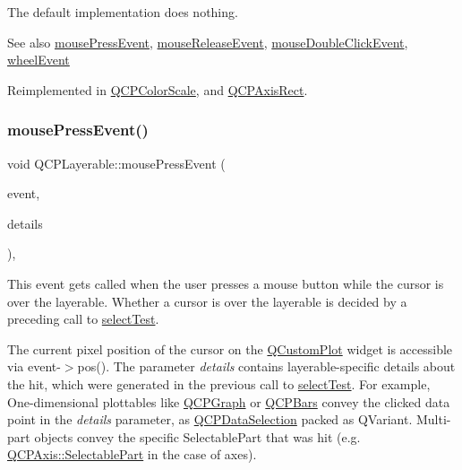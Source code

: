 The default implementation does nothing.

\begin{DoxySeeAlso}{See also}
\mbox{\hyperlink{class_q_c_p_layerable_af6567604818db90f4fd52822f8bc8376}{mouse\+Press\+Event}}, \mbox{\hyperlink{class_q_c_p_layerable_aa0d79b005686f668622bbe66ac03ba2c}{mouse\+Release\+Event}}, \mbox{\hyperlink{class_q_c_p_layerable_a4171e2e823aca242dd0279f00ed2de81}{mouse\+Double\+Click\+Event}}, \mbox{\hyperlink{class_q_c_p_layerable_a47dfd7b8fd99c08ca54e09c362b6f022}{wheel\+Event}} 
\end{DoxySeeAlso}


Reimplemented in \mbox{\hyperlink{class_q_c_p_color_scale_a3b2bd79725aefaf2630fc76e90939442}{Q\+C\+P\+Color\+Scale}}, and \mbox{\hyperlink{class_q_c_p_axis_rect_a9cd27ad8c5cfb49aefd9dbb30def4beb}{Q\+C\+P\+Axis\+Rect}}.

\mbox{\label{class_q_c_p_layerable_af6567604818db90f4fd52822f8bc8376}} 
\subsubsection{\texorpdfstring{mouse\+Press\+Event()}{mousePressEvent()}}
{\footnotesize\ttfamily void Q\+C\+P\+Layerable\+::mouse\+Press\+Event (\begin{DoxyParamCaption}\item[{Q\+Mouse\+Event $\ast$}]{event,  }\item[{const Q\+Variant \&}]{details }\end{DoxyParamCaption})\hspace{0.3cm}{\ttfamily [protected]}, {\ttfamily [virtual]}}

This event gets called when the user presses a mouse button while the cursor is over the layerable. Whether a cursor is over the layerable is decided by a preceding call to \mbox{\hyperlink{class_q_c_p_layerable_a04db8351fefd44cfdb77958e75c6288e}{select\+Test}}.

The current pixel position of the cursor on the \mbox{\hyperlink{class_q_custom_plot}{Q\+Custom\+Plot}} widget is accessible via {\ttfamily event-\/$>$pos()}. The parameter {\itshape details} contains layerable-\/specific details about the hit, which were generated in the previous call to \mbox{\hyperlink{class_q_c_p_layerable_a04db8351fefd44cfdb77958e75c6288e}{select\+Test}}. For example, One-\/dimensional plottables like \mbox{\hyperlink{class_q_c_p_graph}{Q\+C\+P\+Graph}} or \mbox{\hyperlink{class_q_c_p_bars}{Q\+C\+P\+Bars}} convey the clicked data point in the {\itshape details} parameter, as \mbox{\hyperlink{class_q_c_p_data_selection}{Q\+C\+P\+Data\+Selection}} packed as Q\+Variant. Multi-\/part objects convey the specific {\ttfamily Selectable\+Part} that was hit (e.\+g. \mbox{\hyperlink{class_q_c_p_axis_abee4c7a54c468b1385dfce2c898b115f}{Q\+C\+P\+Axis\+::\+Selectable\+Part}} in the case of axes).

